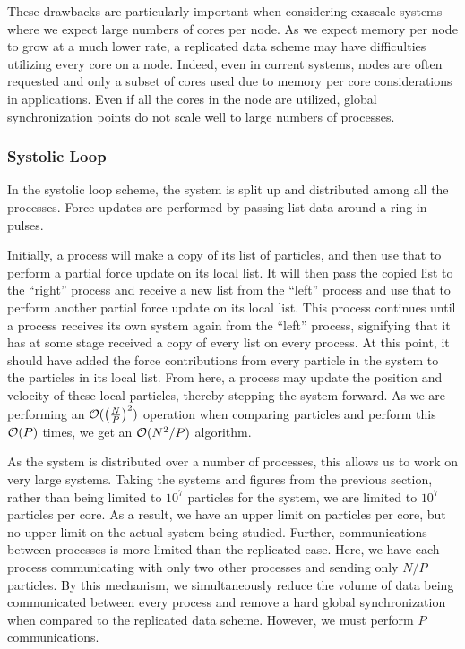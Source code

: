 %
These drawbacks are particularly important when considering exascale systems
where we expect large numbers of cores per node.
%
As we expect memory per node to grow at a much lower rate, a replicated data
scheme may have difficulties utilizing every core on a node.
%
Indeed, even in current systems, nodes are often requested and only a
subset of cores used due to memory per core considerations in applications.
%
Even if all the cores in the node are utilized, global synchronization
points do not scale well to large numbers of processes.



\subsubsection{Systolic Loop}

%
In the systolic loop scheme, the system is split up and distributed among
all the processes.
%
Force updates are performed by passing list data around a ring in pulses.

Initially, a process will make a copy of its list of particles,
and then use that to perform a partial force update on its local list.
%
It will then pass the copied list to the ``right'' process and
receive a new list from the ``left'' process and use that to perform
another partial force update on its local list.
%
This process continues until a process receives its own system again from
the ``left'' process, signifying that it has at some stage received
a copy of every list on every process.
%
At this point, it should have added the force contributions from
every particle in the system to the particles in its local list.
%
From here, a process may update the position and velocity of these local
particles, thereby stepping the system forward.
%
As we are performing an $\mathcal{O}{(\left(\frac{N}{P}\right)^2)}$ operation
when comparing particles and perform this $\mathcal{O}{(P)}$ times, we
get an $\mathcal{O}{(N^2/P)}$ algorithm.


%
As the system is distributed over a number of processes, this allows
us to work on very large systems.
%
Taking the systems and figures from the previous section,
rather than being limited to $10^7$ particles for the system,
we are limited to $10^7$ particles per core.
%
As a result, we have an upper limit on particles per core, but no
upper limit on the actual system being studied.
%
Further, communications between processes is more limited than the
replicated case.
%
Here, we have each process communicating with only two other processes
and sending only $N/P$ particles.
%
By this mechanism, we simultaneously reduce the volume of data
being communicated between every process and
remove a hard global synchronization
when compared to the replicated data scheme.
%
However, we must perform $P$ communications.

